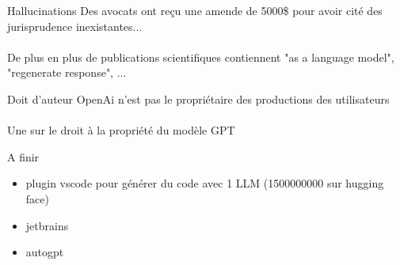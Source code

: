 \begin{frame}{Hallucinations}
  Des avocats ont reçu une amende de 5000\$ pour avoir cité des jurisprudence inexistantes...\\
  \\
  De plus en plus de publications scientifiques contiennent 
  "as a language model", "regenerate response", ...
\end{frame}

\begin{frame}{Doit d'auteur}
  OpenAi n'est pas le propriétaire des productions des utilisateurs \\
  \\
  Une  sur le droit à la propriété du modèle GPT
\end{frame}

\begin{frame}{A finir}
  \begin{itemize}[<+->]
    \item plugin vscode pour générer du code avec 1 LLM (1500000000 sur hugging face)
    \item jetbrains
    \item autogpt
  \end{itemize}
\end{frame}
